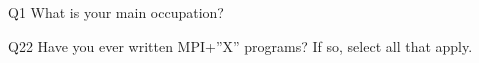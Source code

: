 \begin{description}%
\item{Q1} What is your main occupation?%
\item{Q22} Have you ever written MPI+”X” programs? If so, select all that apply.%
\end{description}%
